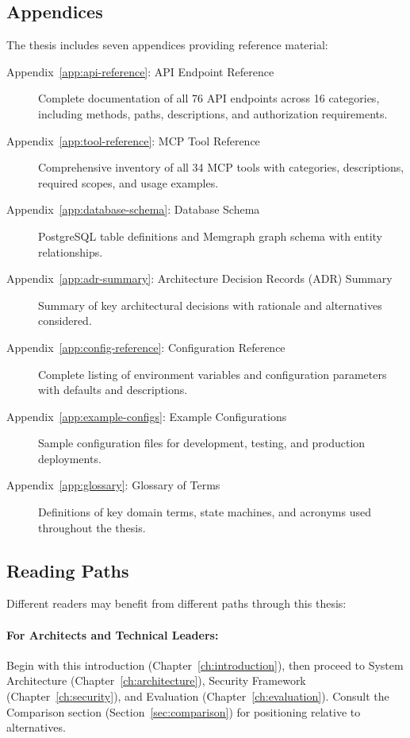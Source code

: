 \documentclass[a4paper,twoside]{sapthesis}
\begin{document}
\subsection{Appendices}

The thesis includes seven appendices providing reference material:

\begin{description}
    \item[Appendix~\ref{app:api-reference}: API Endpoint Reference] Complete documentation of all 76 API endpoints across 16 categories, including methods, paths, descriptions, and authorization requirements.
    
    \item[Appendix~\ref{app:tool-reference}: MCP Tool Reference] Comprehensive inventory of all 34 MCP tools with categories, descriptions, required scopes, and usage examples.
    
    \item[Appendix~\ref{app:database-schema}: Database Schema] PostgreSQL table definitions and Memgraph graph schema with entity relationships.
    
    \item[Appendix~\ref{app:adr-summary}: Architecture Decision Records (ADR) Summary] Summary of key architectural decisions with rationale and alternatives considered.
    
    \item[Appendix~\ref{app:config-reference}: Configuration Reference] Complete listing of environment variables and configuration parameters with defaults and descriptions.
    
    \item[Appendix~\ref{app:example-configs}: Example Configurations] Sample configuration files for development, testing, and production deployments.
    
    \item[Appendix~\ref{app:glossary}: Glossary of Terms] Definitions of key domain terms, state machines, and acronyms used throughout the thesis.
\end{description}

\subsection{Reading Paths}

Different readers may benefit from different paths through this thesis:

\paragraph{For Architects and Technical Leaders:}
Begin with this introduction (Chapter~\ref{ch:introduction}), then proceed to System Architecture (Chapter~\ref{ch:architecture}), Security Framework (Chapter~\ref{ch:security}), and Evaluation (Chapter~\ref{ch:evaluation}). Consult the Comparison section (Section~\ref{sec:comparison}) for positioning relative to alternatives.
\end{document}
